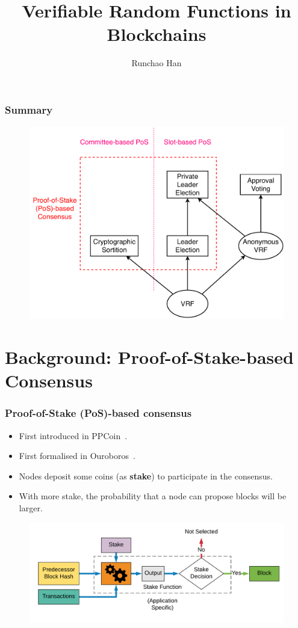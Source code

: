 \documentclass{beamer}
\title{Verifiable Random Functions in Blockchains}
\author{Runchao Han}
\institute{}
\date{}
\begin{document}
\frame{\titlepage}


\begin{frame}
\frametitle{Summary}

\begin{figure}
    \centering
    \includegraphics[width=.7\textwidth]{figs/overview.pdf}
\end{figure}

\end{frame}


\section{Background: Proof-of-Stake-based Consensus}

\begin{frame}
\frametitle{Proof-of-Stake (PoS)-based consensus}

\begin{itemize}
    \item First introduced in PPCoin~\cite{king2012ppcoin}.
    \item First formalised in Ouroboros~\cite{kiayias2017ouroboros}.
    \item Nodes deposit some coins (as \textbf{stake}) to participate in the consensus.
    \item With more stake, the probability that a node can propose blocks will be larger.
\end{itemize}

\begin{figure}
    \centering
    \includegraphics[width=.8\textwidth]{figs/pos-overview.png}
\end{figure}

\end{frame}
\end{document}
